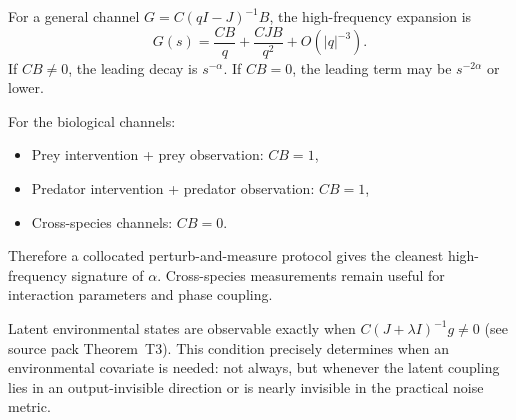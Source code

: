 For a general channel \(G = C (qI - J)^{-1} B\), the high-frequency expansion is
\begin{equation}
G(s) = \frac{CB}{q} + \frac{CJB}{q^2} + O(|q|^{-3}).
\end{equation}
If \(CB \neq 0\), the leading decay is \(s^{-\alpha}\). If \(CB = 0\), the leading term may be \(s^{-2\alpha}\) or lower.

For the biological channels:
\begin{itemize}
    \item Prey intervention + prey observation: \(CB = 1\),
    \item Predator intervention + predator observation: \(CB = 1\),
    \item Cross-species channels: \(CB = 0\).
\end{itemize}
Therefore a collocated perturb-and-measure protocol gives the cleanest high-frequency signature of \(\alpha\).
Cross-species measurements remain useful for interaction parameters and phase coupling.

Latent environmental states are observable exactly when \(C (J + \lambda I)^{-1} g \neq 0\) (see source pack Theorem~T3).
This condition precisely determines when an environmental covariate is needed: not always, but whenever the latent coupling lies in an output-invisible direction or is nearly invisible in the practical noise metric.